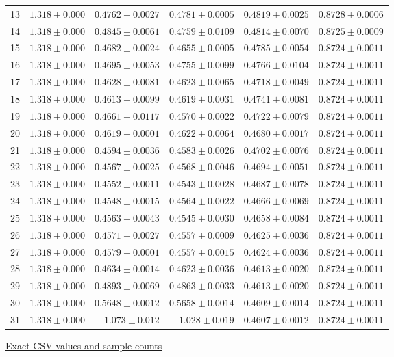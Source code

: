\begin{center}
{\begin{tabular}{lrrrrr}
13 & $1.318\pm0.000$ & $0.4762\pm0.0027$ & $0.4781\pm0.0005$ & $0.4819\pm0.0025$ & $0.8728\pm0.0006$ \\
14 & $1.318\pm0.000$ & $0.4845\pm0.0061$ & $0.4759\pm0.0109$ & $0.4814\pm0.0070$ & $0.8725\pm0.0009$ \\
15 & $1.318\pm0.000$ & $0.4682\pm0.0024$ & $0.4655\pm0.0005$ & $0.4785\pm0.0054$ & $0.8724\pm0.0011$ \\
16 & $1.318\pm0.000$ & $0.4695\pm0.0053$ & $0.4755\pm0.0099$ & $0.4766\pm0.0104$ & $0.8724\pm0.0011$ \\
17 & $1.318\pm0.000$ & $0.4628\pm0.0081$ & $0.4623\pm0.0065$ & $0.4718\pm0.0049$ & $0.8724\pm0.0011$ \\
18 & $1.318\pm0.000$ & $0.4613\pm0.0099$ & $0.4619\pm0.0031$ & $0.4741\pm0.0081$ & $0.8724\pm0.0011$ \\
19 & $1.318\pm0.000$ & $0.4661\pm0.0117$ & $0.4570\pm0.0022$ & $0.4722\pm0.0079$ & $0.8724\pm0.0011$ \\
20 & $1.318\pm0.000$ & $0.4619\pm0.0001$ & $0.4622\pm0.0064$ & $0.4680\pm0.0017$ & $0.8724\pm0.0011$ \\
21 & $1.318\pm0.000$ & $0.4594\pm0.0036$ & $0.4583\pm0.0026$ & $0.4702\pm0.0076$ & $0.8724\pm0.0011$ \\
22 & $1.318\pm0.000$ & $0.4567\pm0.0025$ & $0.4568\pm0.0046$ & $0.4694\pm0.0051$ & $0.8724\pm0.0011$ \\
23 & $1.318\pm0.000$ & $0.4552\pm0.0011$ & $0.4543\pm0.0028$ & $0.4687\pm0.0078$ & $0.8724\pm0.0011$ \\
24 & $1.318\pm0.000$ & $0.4548\pm0.0015$ & $0.4564\pm0.0022$ & $0.4666\pm0.0069$ & $0.8724\pm0.0011$ \\
25 & $1.318\pm0.000$ & $0.4563\pm0.0043$ & $0.4545\pm0.0030$ & $0.4658\pm0.0084$ & $0.8724\pm0.0011$ \\
26 & $1.318\pm0.000$ & $0.4571\pm0.0027$ & $0.4557\pm0.0009$ & $0.4625\pm0.0036$ & $0.8724\pm0.0011$ \\
27 & $1.318\pm0.000$ & $0.4579\pm0.0001$ & $0.4557\pm0.0015$ & $0.4624\pm0.0036$ & $0.8724\pm0.0011$ \\
28 & $1.318\pm0.000$ & $0.4634\pm0.0014$ & $0.4623\pm0.0036$ & $0.4613\pm0.0020$ & $0.8724\pm0.0011$ \\
29 & $1.318\pm0.000$ & $0.4893\pm0.0069$ & $0.4863\pm0.0033$ & $0.4613\pm0.0020$ & $0.8724\pm0.0011$ \\
30 & $1.318\pm0.000$ & $0.5648\pm0.0012$ & $0.5658\pm0.0014$ & $0.4609\pm0.0014$ & $0.8724\pm0.0011$ \\
31 & $1.318\pm0.000$ & $1.073\pm0.012$ & $1.028\pm0.019$ & $0.4607\pm0.0012$ & $0.8724\pm0.0011$ \\
\bottomrule\end{tabular}}
{\footnotesize\href{https://github.com/sanjeevkrishnaa/Compiler-Driven-ACE/blob/codex/ace-scheduler-correctness/docs/latex/qft96_final/data/allocation_mesh_yx_m32.csv}{Exact CSV values and sample counts}}
\end{center}
